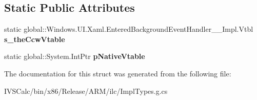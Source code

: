 \subsection*{Static Public Attributes}
\begin{DoxyCompactItemize}
\item 
\mbox{\label{struct_windows_1_1_u_i_1_1_xaml_1_1_entered_background_event_handler_____impl_1_1_vtbl_a1a5e092482f4e0460f03ed4e0f2576bd}} 
static global\+::\+Windows.\+U\+I.\+Xaml.\+Entered\+Background\+Event\+Handler\+\_\+\+\_\+\+Impl.\+Vtbl {\bfseries s\+\_\+the\+Ccw\+Vtable}
\item 
\mbox{\label{struct_windows_1_1_u_i_1_1_xaml_1_1_entered_background_event_handler_____impl_1_1_vtbl_ae2b00c7e6a4ff5667ef46abd60c2484b}} 
static global\+::\+System.\+Int\+Ptr {\bfseries p\+Native\+Vtable}
\end{DoxyCompactItemize}


The documentation for this struct was generated from the following file\+:\begin{DoxyCompactItemize}
\item 
I\+V\+S\+Calc/bin/x86/\+Release/\+A\+R\+M/ilc/Impl\+Types.\+g.\+cs\end{DoxyCompactItemize}
